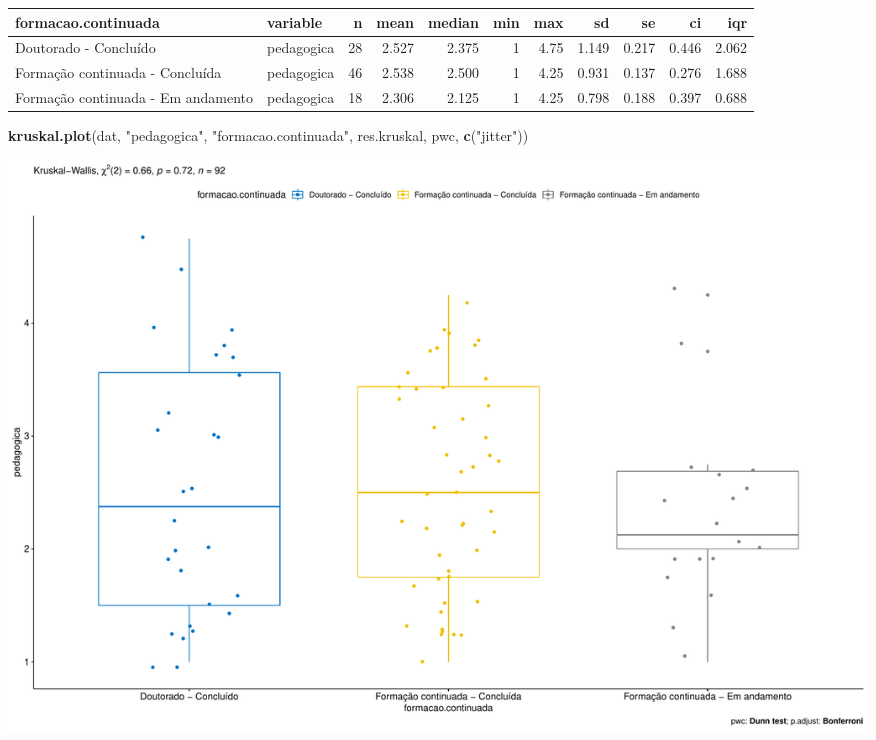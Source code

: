 \documentclass[]{article}
\newenvironment{Shaded}{\begin{snugshade}}{\end{snugshade}}
\newcommand{\KeywordTok}[1]{\textcolor[rgb]{0.13,0.29,0.53}{\textbf{#1}}}
\newcommand{\NormalTok}[1]{#1}
\newcommand{\StringTok}[1]{\textcolor[rgb]{0.31,0.60,0.02}{#1}}
\begin{document}
\begin{longtable}[]{@{}llrrrrrrrrr@{}}
\toprule
formacao.continuada & variable & n & mean & median & min & max & sd & se
& ci & iqr\tabularnewline
\midrule
\endhead
Doutorado - Concluído & pedagogica & 28 & 2.527 & 2.375 & 1 & 4.75 &
1.149 & 0.217 & 0.446 & 2.062\tabularnewline
Formação continuada - Concluída & pedagogica & 46 & 2.538 & 2.500 & 1 &
4.25 & 0.931 & 0.137 & 0.276 & 1.688\tabularnewline
Formação continuada - Em andamento & pedagogica & 18 & 2.306 & 2.125 & 1
& 4.25 & 0.798 & 0.188 & 0.397 & 0.688\tabularnewline
\bottomrule
\end{longtable}

\begin{Shaded}
\begin{Highlighting}[]
\KeywordTok{kruskal.plot}\NormalTok{(dat, }\StringTok{"pedagogica"}\NormalTok{, }\StringTok{"formacao.continuada"}\NormalTok{, res.kruskal, pwc, }\KeywordTok{c}\NormalTok{(}\StringTok{"jitter"}\NormalTok{))}
\end{Highlighting}
\end{Shaded}

\includegraphics{kruskal_files/figure-latex/unnamed-chunk-5-1.pdf}
\end{document}

